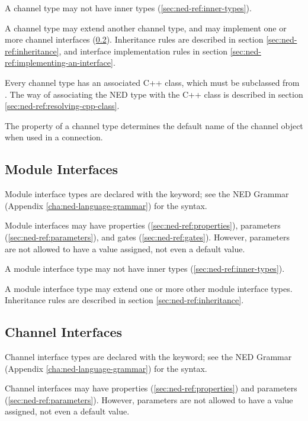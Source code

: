 A channel type may not have inner types (\ref{sec:ned-ref:inner-types}).

A channel type may extend another channel type, and
may implement one or more channel interfaces (\ref{sec:ned-ref:channel-interfaces}).
Inheritance rules are described in section \ref{sec:ned-ref:inheritance},
and interface implementation rules in section \ref{sec:ned-ref:implementing-an-interface}.

Every channel type has an associated C++ class, which must be
subclassed from . The way of associating the
NED type with the C++ class is described in section
\ref{sec:ned-ref:resolving-cpp-class}.

The  property of a channel type determines the default name
of the channel object when used in a connection.


\subsection{Module Interfaces}
\label{sec:ned-ref:module-interfaces}

Module interface types are declared with the  keyword;
see the NED Grammar (Appendix \ref{cha:ned-language-grammar}) for the
syntax.

Module interfaces may have properties (\ref{sec:ned-ref:properties}),
parameters (\ref{sec:ned-ref:parameters}), and
gates (\ref{sec:ned-ref:gates}). However, parameters are not allowed
to have a value assigned, not even a default value.

A module interface type may not have inner types (\ref{sec:ned-ref:inner-types}).

A module interface type may extend one or more other module interface types.
Inheritance rules are described in section \ref{sec:ned-ref:inheritance}.



\subsection{Channel Interfaces}
\label{sec:ned-ref:channel-interfaces}

Channel interface types are declared with the  keyword;
see the NED Grammar (Appendix \ref{cha:ned-language-grammar}) for the
syntax.

Channel interfaces may have properties (\ref{sec:ned-ref:properties}) and
parameters (\ref{sec:ned-ref:parameters}). However, parameters are not
allowed to have a value assigned, not even a default value.

